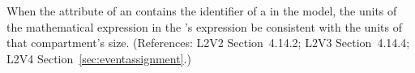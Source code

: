 When the  attribute of an \EventAssignment
contains the identifier of a \Compartment in the model, the
units of the mathematical expression in the
\EventAssignment's  expression  be
consistent with the units of that compartment's size.
(References: L2V2 Section~4.14.2; L2V3 Section~4.14.4; L2V4 Section~\ref{sec:eventassignment}.)
